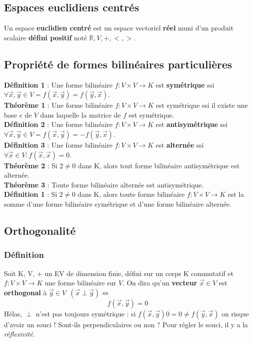 \documentclass[12pt, a4paper, openany]{article}
\begin{document}
\subsection{Espaces euclidiens centrés}
Un espace \textbf{euclidien centré} est un espace vectoriel \textbf{réel} muni d'un produit scalaire \textbf{défini positif} noté $\mathbb{R},V,+, < , >$.

\subsection{Propriété de formes bilinéaires particulières}
\textbf{Définition 1} : Une forme bilinéaire $f : V \times V \rightarrow K$ est \textbf{symétrique} ssi $\forall \vec{x}, \vec{y} \in V = f(\vec{x}, \vec{y}) = f(\vec{y}, \vec{x})$.\\

\textbf{Théorème 1} :
Une forme bilinéaire $f : V \times V \rightarrow K$ est symétrique ssi il existe une base $e$ de $V$ dans laquelle la matrice de $f$ est symétrique.\\

\textbf{Définition 2} : Une forme bilinéaire $f : V \times V \rightarrow K$ est \textbf{antisymétrique} ssi $\forall \vec{x}, \vec{y} \in V = f(\vec{x}, \vec{y}) = -f(\vec{y}, \vec{x})$.\\

\textbf{Définition 3} : Une forme bilinéaire $f : V \times V \rightarrow K$ est \textbf{alternée} ssi $\forall \vec{x} \in V : f(\vec{x}, \vec{x}) = 0$.\\

\textbf{Théorème 2} : Si $2 \neq 0$ dans K, alors tout forme bilinéaire antisymétrique est alternée.\\

\textbf{Théorème 3} : Toute forme bilinéaire alternée est antisymétrique.\\

\textbf{Définition 1} : Si $2 \neq 0$ dans K, alors toute forme bilinéaire $f : V \times V \rightarrow K$ est la somme d'une forme bilinéaire symétrique et d'une forme bilinéaire alternée.\\

\subsection{Orthogonalité}
\subsubsection*{Définition}
Soit K, V, + un EV de dimension finie, défini sur un corps K commutatif et $f : V \times V \rightarrow K$ une forme bilinéaire sur $V$. On dira qu'un \textbf{vecteur} $\vec{x} \in V$ est \textbf{orthogonal} à $\vec{y} \in V\ \ (\vec{x} \perp \vec{y}) \Leftrightarrow$
$$f(\vec{x}, \vec{y}) = 0$$
Hélas, $\perp$ n'est pas toujours symétrique : si $f(\vec{x}, \vec{y}) 0 = 0 \neq f(\vec{y},\vec{x})$ on risque d'avoir un souci ! Sont-ils perpendiculaires ou non ? Pour régler le souci, il y a la \textit{réflexivité}.
\end{document}
